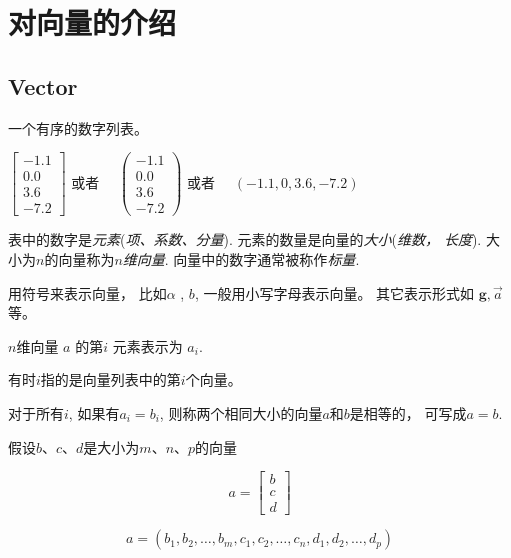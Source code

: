 \chapter{对向量的介绍}

\section{Vector}

\begin{definition}[Vector]
    一个有序的数字列表。

    $  \left[\begin{array}{c}-1.1 \\ 0.0 \\ 3.6 \\ -7.2\end{array}\right]  $ 或者 $  \quad\left(\begin{array}{c}-1.1 \\ 0.0 \\ 3.6 \\ -7.2\end{array}\right)  $ 或者 $  \quad(-1.1,0,3.6,-7.2)  $
\end{definition}

表中的数字是\textit{元素}(\textit{项、系数、分量}). 元素的数量是向量的\textit{大小}(\textit{维数， 长度}). 大小为$n$的向量称为\textit{$n$维向量}. 
向量中的数字通常被称作\textit{标量}. 

用符号来表示向量， 比如$\alpha$ , $b$, 一般用小写字母表示向量。 其它表示形式如 $\boldsymbol{g}, \vec{a}$ 等。

\begin{definition}[$n$维向量 $  a  $ 的第 $  i  $ 元素]
    $n$维向量 $  a  $ 的第$  i  $ 元素表示为 $  a_{i}  $.

    有时$i$指的是向量列表中的第$i$个向量。
\end{definition}

\begin{definition}[$a=b$]
    对于所有$i$, 如果有$a_i = b_i$, 则称两个相同大小的向量$a$和$b$是相等的， 可写成$a = b$.
\end{definition}

\begin{definition}
    假设$b$、$c$、$d$是大小为$m$、$n$、$p$的向量
    
    \begin{equation} a=\left[\begin{array}{l}b \\ c \\ d\end{array}\right] \end{equation}

    \begin{equation} a=\left(b_{1}, b_{2}, \ldots, b_{m}, c_{1}, c_{2}, \ldots, c_{n}, d_{1}, d_{2}, \ldots, d_{p}\right) \end{equation}
\end{definition}

